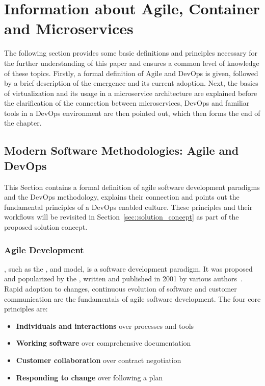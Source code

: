 
\section{Information about Agile, Container and Microservices}\label{sec::backgrund}
The following section provides some basic definitions and principles necessary for the further understanding of this paper and ensures a common level of knowledge of these topics. Firstly, a formal definition of Agile and DevOps is given, followed by a brief description of the emergence and its current adoption. Next, the basics of virtualization and its usage in a microservice architecture are explained before the clarification of the connection between microservices, DevOps and familiar tools in a DevOps environment are then pointed out, which then forms the end of the chapter.

    \subsection{Modern Software Methodologies: Agile and DevOps}\label{ssec::devops}
    This Section contains a formal definition of agile software development paradigms and the DevOps methodology, explains their connection and points out the fundamental principles of a DevOps enabled culture. These principles and their workflows will be revisited in Section~\ref{sec::solution_concept} as part of the proposed solution concept.

        \subsubsection{Agile Development}
        , such as the ,  and  model, is a software development paradigm. It was proposed and popularized by the , written and published in 2001 by various authors~\cite{manifesto}. Rapid adoption to changes, continuous evolution of software and customer communication are the fundamentals of agile software development.\newline
        The four core principles are:

        \begin{itemize}[label=\(\star\)]
            \setlength\itemsep{0em}
            \item \textbf{Individuals and interactions} over processes and tools
            \item \textbf{Working software} over comprehensive documentation
            \item \textbf{Customer collaboration} over contract negotiation
            \item \textbf{Responding to change} over following a plan
        \end{itemize}

